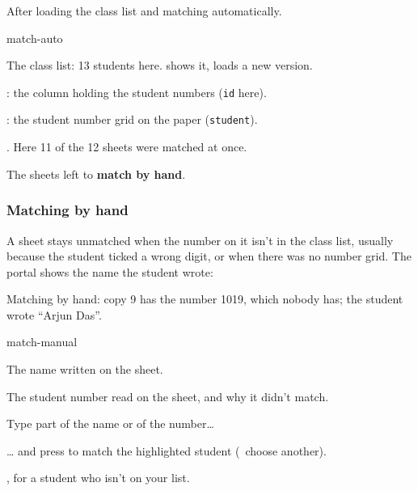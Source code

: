 \documentclass[11pt]{article}
\begin{document}
\begin{keep}
\begin{guidefig}{After loading the class list and matching automatically.}
\begin{shot}{match-auto}
\end{shot}
\end{guidefig}
\begin{callouts}
  \item The class list: 13 students here.  shows it,  loads a new version.
  \item {}: the column holding the student numbers (\texttt{id} here).
  \item {}: the student number grid on the paper (\texttt{student}).
  \item {}. Here 11 of the 12 sheets were matched at once.
  \item The sheets left to \textbf{match by hand}.
\end{callouts}
\end{keep}

\subsubsection{Matching by hand}

A sheet stays unmatched when the number on it isn't in the class list, usually because the student ticked a wrong digit, or when there was no number grid. The portal shows the name the student wrote:

\begin{keep}
\begin{guidefig}{Matching by hand: copy 9 has the number 1019, which nobody has; the student wrote ``Arjun Das''.}
\begin{shot}[0.72\linewidth]{match-manual}
\end{shot}
\end{guidefig}
\begin{callouts}
  \item The name written on the sheet.
  \item The student number read on the sheet, and why it didn't match.
  \item Type part of the name or of the number\ldots
  \item \ldots{} and press  to match the highlighted student (\key{$\uparrow$}\,\key{$\downarrow$} choose another).
  \item {}, for a student who isn't on your list.
\end{callouts}
\end{keep}
\end{document}
